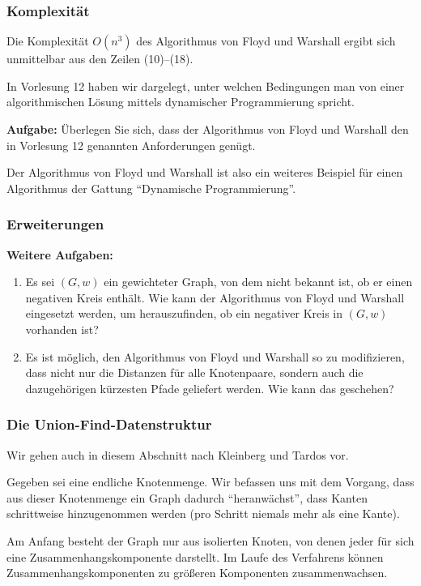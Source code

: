 \documentclass[smaller,xcolor=dvipsnames]{beamer}
\begin{document}
\begin{frame}
\frametitle{Komplexität}
 Die Komplexität $O(n^3)$ des Algorithmus von Floyd und Warshall ergibt sich unmittelbar aus den Zeilen (10)--(18). \\ \medskip

In Vorlesung 12 haben wir dargelegt, unter welchen Bedingungen man von einer algorithmischen Lösung mittels \alert{dynamischer Programmierung} spricht. \\ \medskip 

\textbf{Aufgabe:} Überlegen Sie sich, dass der Algorithmus von Floyd und Warshall den in Vorlesung 12 genannten Anforderungen genügt. \\ \medskip

Der Algorithmus von Floyd und Warshall ist also ein weiteres Beispiel für einen Algorithmus der Gattung \alert{\enquote{Dynamische Programmierung}.}
\end{frame}

\begin{frame}
\frametitle{Erweiterungen}
\textbf{Weitere Aufgaben:}
 \begin{enumerate}[1.]
\item Es sei $(G,w)$ ein gewichteter Graph, von dem nicht bekannt ist, ob er einen \alert{negativen Kreis} enthält. Wie kann der Algorithmus von Floyd und Warshall eingesetzt werden, um herauszufinden, ob ein negativer Kreis in $(G,w)$ vorhanden ist?

\item Es ist möglich, den Algorithmus von Floyd und Warshall so zu modifizieren, dass nicht nur die Distanzen für alle Knotenpaare, sondern auch die dazugehörigen kürzesten Pfade geliefert werden. Wie kann das geschehen?
\end{enumerate}
\end{frame}

\begin{frame}
\frametitle{Die Union-Find-Datenstruktur}
Wir gehen auch in diesem Abschnitt nach Kleinberg und Tardos vor. \\ \medskip 

Gegeben sei eine endliche Knotenmenge. Wir befassen uns mit dem Vorgang, dass aus dieser Knotenmenge ein Graph dadurch \enquote{heranwächst}, dass Kanten schrittweise hinzugenommen werden (pro Schritt niemals mehr als eine Kante). \\ \medskip

Am Anfang besteht der Graph nur aus isolierten Knoten, von denen jeder für sich eine Zusammenhangskomponente darstellt. Im Laufe des Verfahrens können Zusammenhangskomponenten zu größeren Komponenten zusammenwachsen.
\end{frame}
\end{document}
